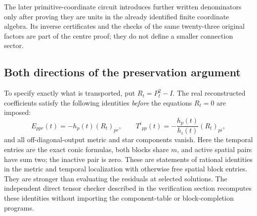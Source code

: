 \documentclass[11pt,a4paper]{article}
\theoremstyle{remark}\newtheorem{remark}[theorem]{Remark}
\begin{document}
The later primitive-coordinate circuit introduces further written
denominators only after proving they are units in the already identified
finite coordinate algebra. Its inverse certificates and the checks of
the same twenty-three original factors are part of the centre proof;
they do not define a smaller connection sector.

\subsection{Both directions of the preservation argument}
\label{integrity:ledger}

To specify exactly what is transported, put $R_t=P_t^2-I$.
The real reconstructed coefficients satisfy the following identities
\emph{before} the equations $R_t=0$ are imposed:
\begin{equation}\label{integrity:direct-residuals}
 E_{ppr}(t)=-h_p(t)(R_t)_{pr},\qquad
 T^i{}_{pp}(t)=-\frac{h_p(t)}{h_i(t)}(R_t)_{pi},
\end{equation}
and all off-diagonal-output metric and star components vanish.
Here the temporal entries are the exact conic formulas, both blocks
share $m$, and active spatial pairs have sum two; the inactive pair
is zero. These are statements of rational identities in the metric
and temporal localization with otherwise free spatial block entries.
They are stronger than evaluating the residuals at selected solutions.
The independent direct tensor checker described in the verification
section recomputes these identities without importing the component-table
or block-completion programs.
\end{document}
